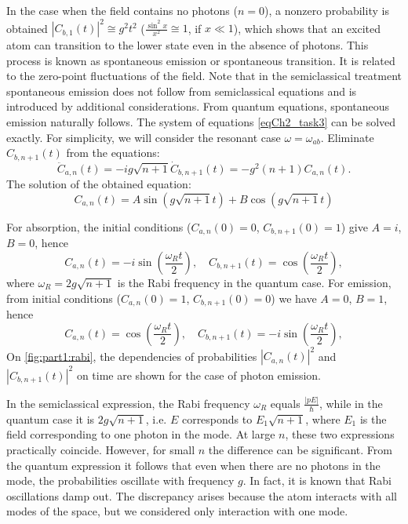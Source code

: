 In the case when the field contains no photons ($n = 0$),
a nonzero probability is obtained 
$\left|C_{b, 1}\left(t\right)\right|^2 \cong g^2 t^2$
($\frac{\sin^2 x}{x^2} \cong 1$, if
$x \ll 1$), which shows that an excited atom can transition to the lower state even in the absence of photons. This process is known as spontaneous emission or spontaneous transition. It
is related to the zero-point fluctuations of the field. Note that in the semiclassical
treatment spontaneous emission does not follow from semiclassical equations and is introduced by additional considerations. From quantum equations,
spontaneous emission naturally follows. 
The system of equations \eqref{eqCh2_task3} can be solved exactly. For simplicity,
we will consider the resonant case $\omega = \omega_{ab}$.
Eliminate $C_{b, n + 1}\left(t\right)$ from the equations:   
\[
{\ddot C}_{a,n}\left(t\right) = -i g \sqrt{n + 1}
{\dot C}_{b, n + 1}\left(t\right) = -g^2 \left(n + 1\right)
C_{a,n}\left(t\right). 
\]
The solution of the obtained equation:
\begin{equation}
C_{a,n}\left(t\right) = A \sin\left(g \sqrt{n + 1} t\right) +
B \cos\left(g \sqrt{n + 1} t\right)
\nonumber
\end{equation}

For absorption, the initial conditions ($C_{a,n}\left(0\right) = 0$, $C_{b,n+1}\left(0\right)
= 1$) give $A = i$, $B = 0$, hence  
\begin{equation}
C_{a,n}\left(t\right) = -i \sin\left(\frac{\omega_R t}{2}\right), \quad
C_{b, n + 1}\left(t\right) = \cos\left(\frac{\omega_R t}{2}\right),
\label{eqPart1RabiAbsorbtion}
\end{equation}
where $\omega_R = 2g\sqrt{n + 1}$ is the Rabi frequency in the quantum case. For emission, from initial conditions ($C_{a,n}\left(0\right) = 1$,
$C_{b,n+1}\left(0\right) = 0$) we have $A = 0$, $B = 1$, hence 
\begin{equation}
C_{a,n}\left(t\right) = \cos\left(\frac{\omega_R t}{2}\right), \quad
C_{b, n + 1}\left(t\right) = -i \sin\left(\frac{\omega_R t}{2}\right),
\label{eqPart1RabiEmission}
\end{equation}
On \autoref{fig:part1:rabi}, the dependencies of probabilities 
$\left|C_{a,n}\left(t\right)\right|^2$ and 
$\left|C_{b, n + 1}\left(t\right)\right|^2$ on time are shown for the case
of photon emission.


In the semiclassical expression, the Rabi frequency $\omega_R$ equals 
$\frac{\left|p E\right|}{\hbar}$, while in the quantum case it is $2g\sqrt{n + 1}$,
i.e. $E$ corresponds to $E_1\sqrt{n + 1}$, where $E_1$ is the field
corresponding to one photon in the mode.  At large $n$, these two
expressions practically coincide. However, for small $n$ the difference can be 
significant. From the quantum expression it follows that even when there are no photons in the mode, the probabilities oscillate with frequency $g$.  In fact, 
it is known that Rabi oscillations damp out. The discrepancy arises because the atom interacts with all modes of the space, but we considered only interaction with one mode.  

